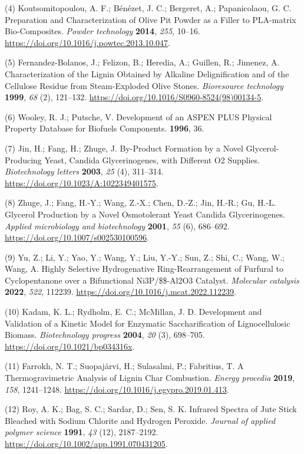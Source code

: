 \documentclass[11pt]{article}
\begin{document}
\hypertarget{citeproc_bib_item_4}{(4) Koutsomitopoulou, A. F.; Bénézet, J. C.; Bergeret, A.; Papanicolaou, G. C. Preparation and Characterization of Olive Pit Powder as a Filler to PLA-matrix Bio-Composites. \textit{Powder technology} \textbf{2014}, \textit{255}, 10–16. \url{https://doi.org/10.1016/j.powtec.2013.10.047}.}

\hypertarget{citeproc_bib_item_5}{(5) Fernandez-Bolanos, J.; Felizon, B.; Heredia, A.; Guillen, R.; Jimenez, A. Characterization of the Lignin Obtained by Alkaline Delignification and of the Cellulose Residue from Steam-Exploded Olive Stones. \textit{Bioresource technology} \textbf{1999}, \textit{68} (2), 121–132. \url{https://doi.org/10.1016/S0960-8524(98)00134-5}.}

\hypertarget{citeproc_bib_item_6}{(6) Wooley, R. J.; Putsche, V. Development of an ASPEN PLUS Physical Property Database for Biofuels Components. \textbf{1996}, 36.}

\hypertarget{citeproc_bib_item_7}{(7) Jin, H.; Fang, H.; Zhuge, J. By-Product Formation by a Novel Glycerol-Producing Yeast, Candida Glycerinogenes, with Different O2 Supplies. \textit{Biotechnology letters} \textbf{2003}, \textit{25} (4), 311–314. \url{https://doi.org/10.1023/A:1022349401575}.}

\hypertarget{citeproc_bib_item_8}{(8) Zhuge, J.; Fang, H.-Y.; Wang, Z.-X.; Chen, D.-Z.; Jin, H.-R.; Gu, H.-L. Glycerol Production by a Novel Osmotolerant Yeast Candida Glycerinogenes. \textit{Applied microbiology and biotechnology} \textbf{2001}, \textit{55} (6), 686–692. \url{https://doi.org/10.1007/s002530100596}.}

\hypertarget{citeproc_bib_item_9}{(9) Yu, Z.; Li, Y.; Yao, Y.; Wang, Y.; Liu, Y.-Y.; Sun, Z.; Shi, C.; Wang, W.; Wang, A. Highly Selective Hydrogenative Ring-Rearrangement of Furfural to Cyclopentanone over a Bifunctional Ni3P/\$\gamma\$-Al2O3 Catalyst. \textit{Molecular catalysis} \textbf{2022}, \textit{522}, 112239. \url{https://doi.org/10.1016/j.mcat.2022.112239}.}

\hypertarget{citeproc_bib_item_10}{(10) Kadam, K. L.; Rydholm, E. C.; McMillan, J. D. Development and Validation of a Kinetic Model for Enzymatic Saccharification of Lignocellulosic Biomass. \textit{Biotechnology progress} \textbf{2004}, \textit{20} (3), 698–705. \url{https://doi.org/10.1021/bp034316x}.}

\hypertarget{citeproc_bib_item_11}{(11) Farrokh, N. T.; Suopajärvi, H.; Sulasalmi, P.; Fabritius, T. A Thermogravimetric Analysis of Lignin Char Combustion. \textit{Energy procedia} \textbf{2019}, \textit{158}, 1241–1248. \url{https://doi.org/10.1016/j.egypro.2019.01.413}.}

\hypertarget{citeproc_bib_item_12}{(12) Roy, A. K.; Bag, S. C.; Sardar, D.; Sen, S. K. Infrared Spectra of Jute Stick Bleached with Sodium Chlorite and Hydrogen Peroxide. \textit{Journal of applied polymer science} \textbf{1991}, \textit{43} (12), 2187–2192. \url{https://doi.org/10.1002/app.1991.070431205}.}
\end{document}
